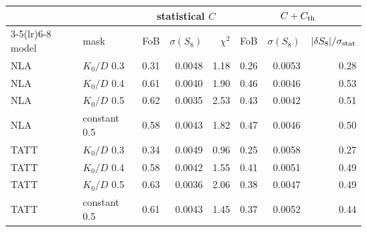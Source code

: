 \begin{tabular}{llrrrrrr}\toprule
 & & \multicolumn{3}{c}{statistical $C$} & \multicolumn{3}{c}{$C + C_{\rm th}$}\\ \cmidrule(lr){3-5}\cmidrule(lr){6-8}
model & mask & FoB & $\sigma(S_8)$ & $\chi^2$ & FoB & $\sigma(S_8)$ & $|\delta S_8|/\sigma_{\rm stat}$\\ \midrule
NLA & $K_0/D$ 0.3 & 0.31 & 0.0048 & 1.18 & 0.26 & 0.0053 & 0.28\\
NLA & $K_0/D$ 0.4 & 0.61 & 0.0040 & 1.90 & 0.46 & 0.0046 & 0.53\\
NLA & $K_0/D$ 0.5 & 0.62 & 0.0035 & 2.53 & 0.43 & 0.0042 & 0.51\\
NLA & constant 0.5 & 0.58 & 0.0043 & 1.82 & 0.47 & 0.0046 & 0.50\\
TATT & $K_0/D$ 0.3 & 0.34 & 0.0049 & 0.96 & 0.25 & 0.0058 & 0.27\\
TATT & $K_0/D$ 0.4 & 0.58 & 0.0042 & 1.55 & 0.41 & 0.0051 & 0.49\\
TATT & $K_0/D$ 0.5 & 0.63 & 0.0036 & 2.06 & 0.38 & 0.0047 & 0.49\\
TATT & constant 0.5 & 0.61 & 0.0043 & 1.45 & 0.37 & 0.0052 & 0.44\\
\bottomrule\end{tabular}